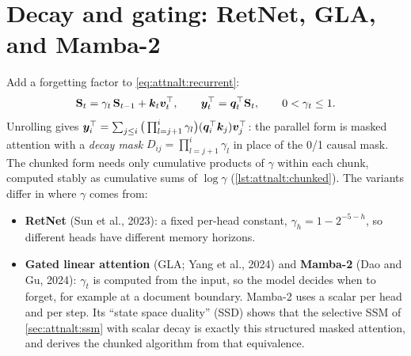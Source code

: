 \section{Decay and gating: RetNet, GLA, and Mamba-2}\label{sec:attnalt:gating}

Add a forgetting factor to \cref{eq:attnalt:recurrent}:
\begin{equation}
\mathbf{S}_t=\gamma_t\,\mathbf{S}_{t-1}+\bm{k}_t\bm{v}_t^\top,\qquad\bm{y}_t^\top=\bm{q}_t^\top\mathbf{S}_t,
\qquad 0<\gamma_t\le1 .
\label{eq:attnalt:gated}
\end{equation}
Unrolling gives $\bm{y}_i^\top=\sum_{j\le i}\big(\prod_{l=j+1}^{i}\gamma_l\big)(\bm{q}_i^\top\bm{k}_j)\bm{v}_j^\top$:
the parallel form is masked attention with a \emph{decay mask} $D_{ij}=\prod_{l=j+1}^i\gamma_l$ in place of the
0/1 causal mask. The chunked form needs only cumulative products of $\gamma$ within each chunk, computed
stably as cumulative sums of $\log\gamma$ (\cref{lst:attnalt:chunked}). The variants differ in where
$\gamma$ comes from:
\begin{itemize}
\item \textbf{RetNet} (Sun et al., 2023): a fixed per-head constant, $\gamma_h=1-2^{-5-h}$, so different
  heads have different memory horizons.
\item \textbf{Gated linear attention} (GLA; Yang et al., 2024) and \textbf{Mamba-2} (Dao and Gu, 2024):
  $\gamma_t$ is computed from the input, so the model decides when to forget, for example at a document
  boundary. Mamba-2 uses a scalar per head and per step. Its ``state space duality'' (SSD) shows that the
  selective SSM of \cref{sec:attnalt:ssm} with scalar decay is exactly this structured masked attention,
  and derives the chunked algorithm from that equivalence.
\end{itemize}

